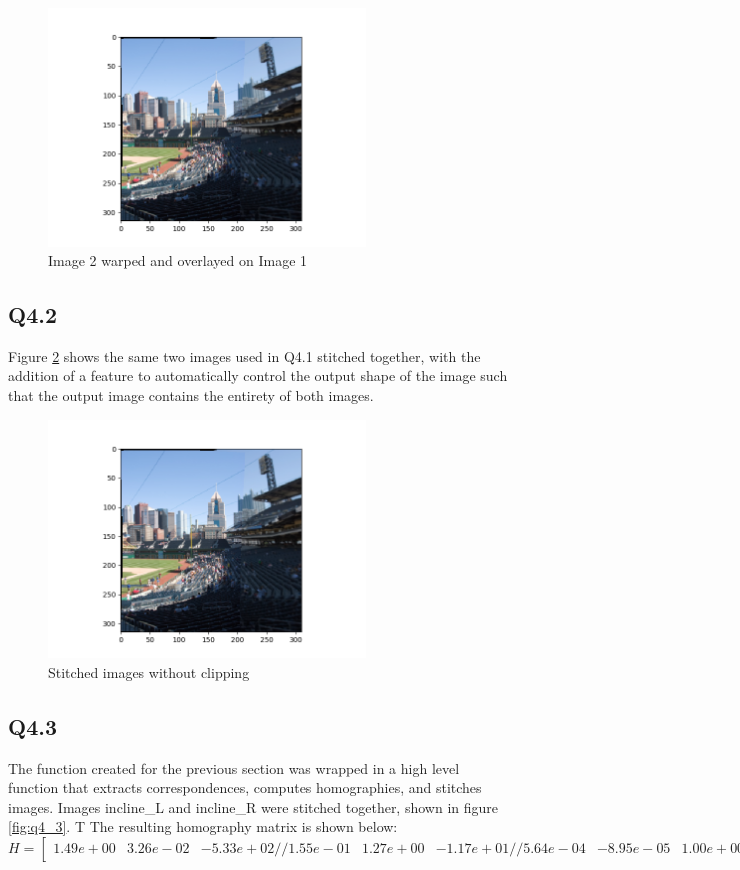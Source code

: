 \documentclass[12pt]{article}
\begin{document}
\begin{figure}[H]
\centering
\includegraphics[page=1,width=0.75\textwidth]{q4_1}
\caption{ Image 2 warped and overlayed on Image 1 }
\label{fig:q41}
\end{figure}   


\newpage
\subsection { Q4.2 }
Figure \ref{fig:q42} shows the same two images used in Q4.1 stitched together, with the addition of a feature to automatically control the output shape of the image such that the output image contains the entirety of both images.

\begin{figure}[H]
\centering
\includegraphics[page=1,width=0.75\textwidth]{q4_1}
\caption{ Stitched images without clipping}
\label{fig:q42}
\end{figure}   


\newpage
\subsection { Q4.3 }
The function created for the previous section was wrapped in a high level function that extracts correspondences, computes homographies, and stitches images. Images incline\_L and incline\_R were stitched together, shown in figure \ref{fig:q4_3}.
T
The resulting homography matrix is shown below:
$$
H = 
\begin {bmatrix}
1.49e+00 &  3.26e-02 & -5.33e+02 //
1.55e-01 &  1.27e+00 & -1.17e+01 //
5.64e-04 & -8.95e-05 &  1.00e+00
\end {bmatrix}
$$
\end{document}
